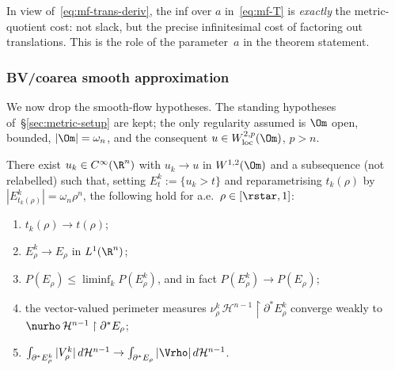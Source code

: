 In view of~\eqref{eq:mf-trans-deriv}, the inf over $a$ in~\eqref{eq:mf-T} is
\emph{exactly} the metric-quotient cost: not slack, but the precise
infinitesimal cost of factoring out translations. This is the role of the
parameter~$a$ in the theorem statement.

\subsubsection{BV/coarea smooth approximation}
\label{sec:metric-T-approx}

We now drop the smooth-flow hypotheses. The standing hypotheses
of~\S\ref{sec:metric-setup} are kept; the only regularity assumed is
$\Om$ open, bounded, $|\Om|=\omega_n$, and the consequent
$u\in W^{2,p}_{\rm loc}(\Om)$, $p>n$.

\begin{lemma}\label{lem:mf-approx}
There exist $u_k\in C^\infty(\R^n)$ with $u_k\to u$ in $W^{1,2}(\Om)$ and a
subsequence (not relabelled) such that, setting
$E_t^k:=\{u_k>t\}$ and reparametrising $t_k(\rho)$ by
$|E^k_{t_k(\rho)}|=\omega_n\rho^n$, the following hold for a.e.\
$\rho\in[\rstar,1]$:
\begin{enumerate}
\item[(a)] $t_k(\rho)\to t(\rho)$;
\item[(b)] $E^k_\rho\to E_\rho$ in $L^1(\R^n)$;
\item[(c)] $P(E_\rho)\le\liminf_k P(E^k_\rho)$, and in fact $P(E^k_\rho)\to
   P(E_\rho)$;
\item[(d)] the vector-valued perimeter measures
   $\nu^k_\rho\,\mathcal H^{n-1}\restriction\partial^*E^k_\rho$ converge
   weakly to $\nurho\,\mathcal H^{n-1}\restriction\partial^*E_\rho$;
\item[(e)] $\int_{\partial^*E^k_\rho}|V^k_\rho|\,d\mathcal H^{n-1}
   \to\int_{\partial^*E_\rho}|\Vrho|\,d\mathcal H^{n-1}$.
\end{enumerate}
\end{lemma}

